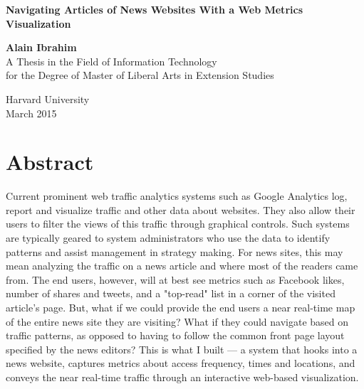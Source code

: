\documentclass[12pt]{article}
\begin{document}

\begin{titlepage}
    \begin{center}
        
        \begin{doublespace}        
        \textbf{\Large Navigating Articles of News Websites With a Web Metrics Visualization}
        \vfill

        \vspace{2in}
        \textbf{\Large Alain Ibrahim} \\
		\vspace{2in}
        A Thesis in the Field of Information Technology \\
        for the Degree of Master of Liberal Arts in Extension Studies \\

        \vspace{.5in} 

        
        Harvard University \\
        \vspace {.4in}
        March 2015        

		\end{doublespace}        
        
        \vfill
         
    \end{center}
\end{titlepage}


\section{Abstract}

Current prominent web traffic analytics systems such as Google Analytics log, report and visualize traffic and other data about websites. They also allow their users to filter the views of this traffic through graphical controls. Such systems are typically geared to system administrators who use the data to identify patterns and assist management in strategy making. For news sites, this may mean analyzing the traffic on a news article and where most of the readers came from. The end users, however, will at best see metrics such as Facebook likes, number of shares and tweets, and a "top-read" list in a corner of the visited article's page. But, what if we could provide the end users a near real-time map of the entire news site they are visiting? What if they could navigate based on traffic patterns, as opposed to having to follow the common front page layout specified by the news editors? This is what I built --- a system that hooks into a news website, captures metrics about access frequency, times and locations, and conveys the near real-time traffic through an interactive web-based visualization.
\newpage
\end{document}
